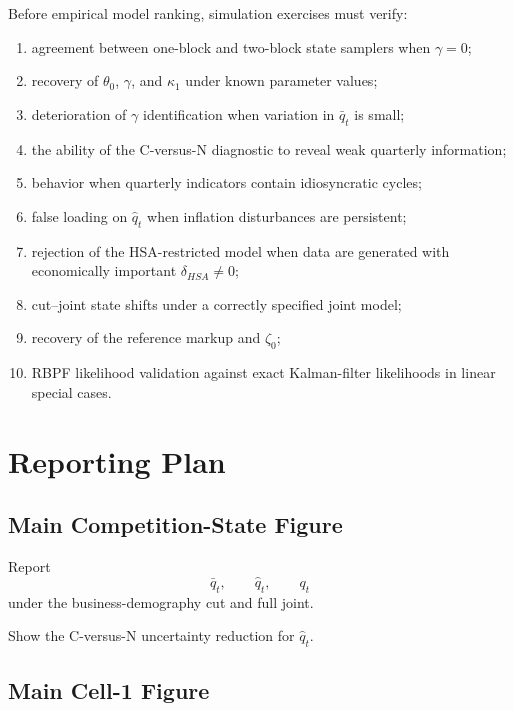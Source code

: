 \documentclass[11pt]{article}
\begin{document}
Before empirical model ranking, simulation exercises must verify:
\begin{enumerate}
\item agreement between one-block and two-block state samplers when \(\gamma=0\);
\item recovery of \(\theta_0\), \(\gamma\), and \(\kappa_1\) under known parameter values;
\item deterioration of \(\gamma\) identification when variation in \(\bar q_t\) is small;
\item the ability of the C-versus-N diagnostic to reveal weak quarterly information;
\item behavior when quarterly indicators contain idiosyncratic cycles;
\item false loading on \(\hat q_t\) when inflation disturbances are persistent;
\item rejection of the HSA-restricted model when data are generated with economically important \(\delta_{HSA}\neq0\);
\item cut--joint state shifts under a correctly specified joint model;
\item recovery of the reference markup and \(\zeta_0\);
\item RBPF likelihood validation against exact Kalman-filter likelihoods in linear special cases.
\end{enumerate}

\section{Reporting Plan}

\subsection{Main Competition-State Figure}

Report
\begin{equation}
\bar q_t,
\qquad
\hat q_t,
\qquad
q_t
\end{equation}
under the business-demography cut and full joint.

Show the C-versus-N uncertainty reduction for \(\hat q_t\).

\subsection{Main Cell-1 Figure}
\end{document}
